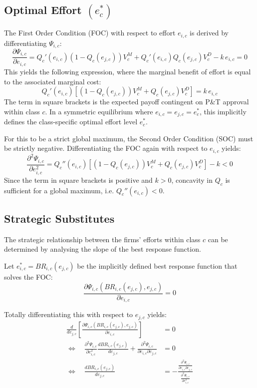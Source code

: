 \documentclass[12pt]{article}
\begin{document}
\subsection{Optimal Effort \texorpdfstring{$(e_c^*)$}{(ec*)}}
The First Order Condition (FOC) with respect to effort $e_{i,c}$ is derived by differentiating $\Psi_{i,c}$:
\begin{equation}
    \frac{\partial \Psi_{i,c}}{\partial e_{i,c}} = Q_c'(e_{i,c})(1-Q_c(e_{j,c})) V_c^M + Q_c'(e_{i,c})Q_c(e_{j,c}) V_c^D - k \, e_{i,c} = 0
\end{equation}
This yields the following expression, where the marginal benefit of effort is equal to the associated marginal cost:
\begin{equation} \label{eq:FOC_final}
    Q_c'(e_{i,c}) \left[ (1-Q_c(e_{j,c})) V_c^M + Q_c(e_{j,c}) V_c^D \right] = k \, e_{i,c}
\end{equation}
The term in square brackets is the expected payoff contingent on P\&T approval within class $c$. In a symmetric equilibrium where $e_{i,c} = e_{j,c} = e_c^*$, this implicitly defines the class-specific optimal effort level $e_c^*$. 

For this to be a strict global maximum, the Second Order Condition (SOC) must be strictly negative. Differentiating the FOC again with respect to $e_{i,c}$ yields:
\begin{equation}
    \frac{\partial^2 \Psi_{i,c}}{\partial e_{i,c}^2} = Q_c''(e_{i,c}) \left[ (1-Q_c(e_{j,c})) V_c^M + Q_c(e_{j,c}) V_c^D \right] - k < 0
\end{equation}
Since the term in square brackets is positive and $k>0$, concavity in $Q_c$ is sufficient for a global maximum, i.e. $Q_c''(e_{i,c})<0$.

\subsection{Strategic Substitutes}
The strategic relationship between the firms' efforts within class $c$ can be determined by analysing the slope of the best response function.

Let $e^*_{i,c} = BR_{i,c}(e_{j,c})$ be the implicitly defined best response function that solves the FOC:
\begin{equation}
    \frac{\partial \Psi_{i,c} (BR_{i,c}(e_{j,c}), e_{j,c})}{\partial e_{i,c}} = 0
\end{equation}

Totally differentiating this with respect to $e_{j,c}$ yields:
\begin{align}
    \frac{d}{d e_{j,c}}\left[\frac{\partial \Psi_{i,c}(BR_{i,c}(e_{j,c}),e_{j,c})}{\partial e_{i,c}}\right] &= 0 \\[0.5em]
    \Longleftrightarrow \quad
    \frac{\partial^2 \Psi_{i,c}}{\partial e_{i,c}^2}\frac{d BR_{i,c}(e_{j,c})}{d e_{j,c}}
    +
    \frac{\partial^2 \Psi_{i,c}}{\partial e_{i,c} \partial e_{j,c}} &= 0 \\[0.5em]
    \Longleftrightarrow \quad
    \frac{d BR_{i,c}(e_{j,c})}{d e_{j,c}}
    &=
    -
    \frac{\frac{\partial^2 \Psi_{i,c}}{\partial e_{i,c} \partial e_{j,c}}}
    {\frac{\partial^2 \Psi_{i,c}}{\partial e_{i,c}^2}}
\end{align}
\end{document}
